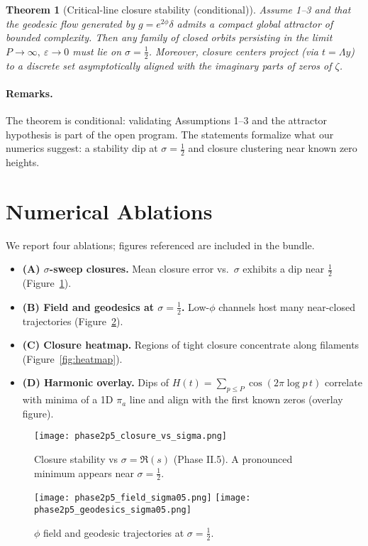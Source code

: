 \documentclass[11pt]{article}
\newtheorem{theorem}{Theorem}
\begin{document}
\begin{theorem}[Critical-line closure stability (conditional)]
Assume 1--3 and that the geodesic flow generated by $g=e^{2\phi}\delta$ admits a compact global attractor of bounded complexity. Then any family of closed orbits persisting in the limit $P\to\infty,\ \varepsilon\to 0$ must lie on $\sigma=\tfrac12$. Moreover, closure centers project (via $t=\Lambda y$) to a discrete set asymptotically aligned with the imaginary parts of zeros of $\zeta$.
\end{theorem}

\paragraph{Remarks.} The theorem is conditional: validating Assumptions 1--3 and the attractor hypothesis is part of the open program. The statements formalize what our numerics suggest: a stability dip at $\sigma=\tfrac12$ and closure clustering near known zero heights.

\section{Numerical Ablations}
We report four ablations; figures referenced are included in the bundle.
\begin{itemize}
\item \textbf{(A) $\sigma$-sweep closures.} Mean closure error vs.\ $\sigma$ exhibits a dip near $\tfrac12$ (Figure~\ref{fig:closure}).
\item \textbf{(B) Field and geodesics at $\sigma=\tfrac12$.} Low-$\phi$ channels host many near-closed trajectories (Figure~\ref{fig:field_geo}).
\item \textbf{(C) Closure heatmap.} Regions of tight closure concentrate along filaments (Figure~\ref{fig:heatmap}).
\item \textbf{(D) Harmonic overlay.} Dips of $H(t)=\sum_{p\le P}\cos(2\pi \log p\, t)$ correlate with minima of a 1D $\pi_a$ line and align with the first known zeros (overlay figure).
\end{itemize}

\begin{figure}[h!]
  \centering
  \texttt{[image: phase2p5\_closure\_vs\_sigma.png]}
  \caption{Closure stability vs $\sigma=\Re(s)$ (Phase II.5). A pronounced minimum appears near $\sigma=\tfrac12$.}
  \label{fig:closure}
\end{figure}

\begin{figure}[h!]
  \centering
  \texttt{[image: phase2p5\_field\_sigma05.png]}\hfill
  \texttt{[image: phase2p5\_geodesics\_sigma05.png]}
  \caption{$\phi$ field and geodesic trajectories at $\sigma=\tfrac12$.}
  \label{fig:field_geo}
\end{figure}
\end{document}
